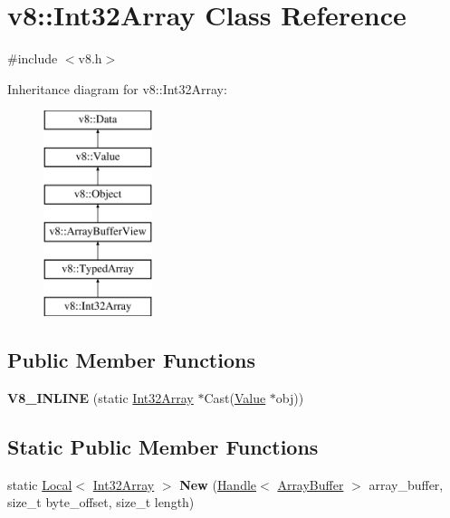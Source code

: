 \hypertarget{classv8_1_1_int32_array}{}\section{v8\+:\+:Int32\+Array Class Reference}
\label{classv8_1_1_int32_array}


{\ttfamily \#include $<$v8.\+h$>$}

Inheritance diagram for v8\+:\+:Int32\+Array\+:\begin{figure}[H]
\begin{center}
\leavevmode
\includegraphics[height=6.000000cm]{classv8_1_1_int32_array}
\end{center}
\end{figure}
\subsection*{Public Member Functions}
\begin{DoxyCompactItemize}
\item 
\hypertarget{classv8_1_1_int32_array_a4b9ec8339bc592ed0216e5c980b570ed}{}{\bfseries V8\+\_\+\+I\+N\+L\+I\+N\+E} (static \hyperlink{classv8_1_1_int32_array}{Int32\+Array} $\ast$Cast(\hyperlink{classv8_1_1_value}{Value} $\ast$obj))\label{classv8_1_1_int32_array_a4b9ec8339bc592ed0216e5c980b570ed}

\end{DoxyCompactItemize}
\subsection*{Static Public Member Functions}
\begin{DoxyCompactItemize}
\item 
\hypertarget{classv8_1_1_int32_array_a41fa255626b8e00e9cc9f5d4e0c518d5}{}static \hyperlink{classv8_1_1_local}{Local}$<$ \hyperlink{classv8_1_1_int32_array}{Int32\+Array} $>$ {\bfseries New} (\hyperlink{classv8_1_1_handle}{Handle}$<$ \hyperlink{classv8_1_1_array_buffer}{Array\+Buffer} $>$ array\+\_\+buffer, size\+\_\+t byte\+\_\+offset, size\+\_\+t length)\label{classv8_1_1_int32_array_a41fa255626b8e00e9cc9f5d4e0c518d5}

\end{DoxyCompactItemize}


